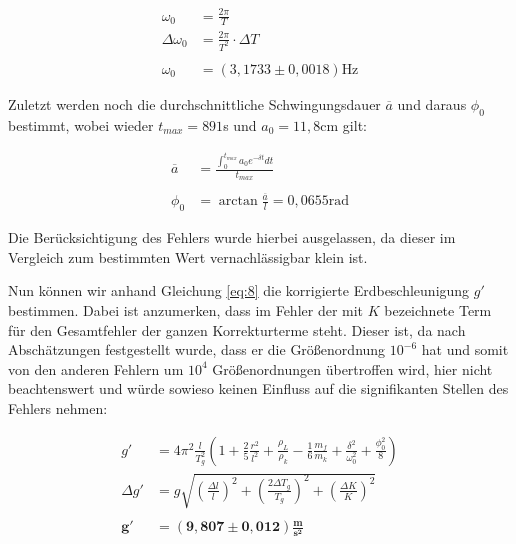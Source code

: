 \documentclass{article}
\begin{document}
\begin{equation}
    \begin{split}
        \omega_0 &= \frac{2\pi}{T} \\
        \Delta \omega_0 &= \frac{2\pi}{T^2}\cdot \Delta T \\ \\
        \omega_0 &= (3,1733 \pm 0,0018) \text{Hz}
    \end{split}
    \label{res:omega}
\end{equation}

Zuletzt werden noch die durchschnittliche Schwingungsdauer $\overline{a}$ und daraus $\phi_0$ bestimmt, wobei wieder $t_{max}=891$s und $a_0 = 11,8$cm gilt:

\begin{equation}
    \begin{split}
        \overline{a} &= \frac{\int_0^{t_{max}} a_0 e^{-\delta t}dt}{t_{max}} \\ \\
        \phi_0 &= \arctan{\frac{\overline{a}}{l}} = 0,0655 \text{rad}
    \end{split}
    \label{res:phi0}
\end{equation}

Die Berücksichtigung des Fehlers wurde hierbei ausgelassen, da dieser im Vergleich zum bestimmten Wert vernachlässigbar klein ist.

Nun können wir anhand Gleichung \ref{eq:8} die korrigierte Erdbeschleunigung $g'$ bestimmen. Dabei ist anzumerken, dass im Fehler der mit $K$ bezeichnete Term für den Gesamtfehler der ganzen Korrekturterme steht. Dieser ist, da nach Abschätzungen festgestellt wurde, dass er die Größenordnung $10^{-6}$ hat und somit von den anderen Fehlern um $10^4$ Größenordnungen übertroffen wird, hier nicht beachtenswert und würde sowieso keinen Einfluss auf die signifikanten Stellen des Fehlers nehmen:

\begin{equation}
    \begin{split}
        g' &= 4\pi^2 \frac{l}{T_g^2} \left( 1+\frac{2}{5}\frac{r^2}{l^2}+\frac{\rho_L}{\rho_k}-\frac{1}{6}\frac{m_f}{m_k}+\frac{\delta^2}{\omega_0^2}+\frac{\phi_0^2}{8} \right) \\
        \Delta g' &= g \sqrt{\left( \frac{\Delta l}{l} \right)^2 + \left( \frac{2 \Delta T_g}{T_g} \right)^2 + \left( \frac{\Delta K}{K} \right)^2} \\ \\
        \bm{g'} &= \bm{(9,807 \pm 0,012) \frac{\textbf{m}}{\textbf{s}^2}}
    \end{split}
\end{equation}
\end{document}
